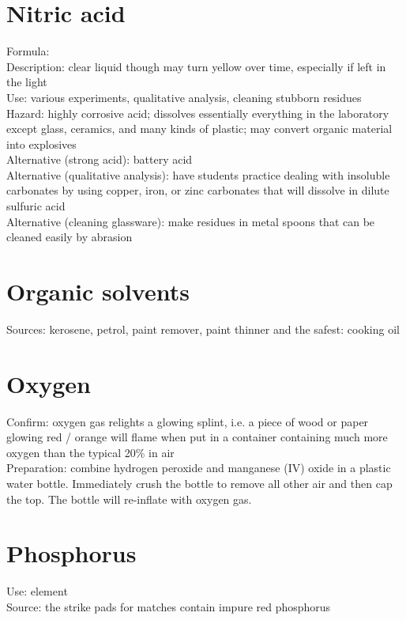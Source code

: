 \section{Nitric acid}
\label{sec:}
Formula: \\
Description: clear liquid though may turn yellow over time, 
especially if left in the light\\
Use: various experiments, 
qualitative analysis, 
cleaning stubborn residues\\
Hazard: highly corrosive acid; 
dissolves essentially everything in the laboratory except glass, 
ceramics, 
and many kinds of plastic; 
may convert organic material into explosives\\
Alternative (strong acid): battery acid\\
Alternative (qualitative analysis): 
have students practice dealing with insoluble carbonates by using copper, 
iron, 
or zinc carbonates that will dissolve in dilute sulfuric acid\\
Alternative (cleaning glassware): 
make residues in metal spoons that can be cleaned easily by abrasion

\section{Organic solvents}
\label{sec:}
Sources: kerosene, 
petrol, 
paint remover, 
paint thinner and the safest: cooking oil

\section{Oxygen}
\label{sec:}
Confirm: oxygen gas relights a glowing splint, 
i.e. 
a piece of wood or paper glowing red / orange 
will flame when put in a container 
containing much more oxygen than the typical 20\% in air\\
Preparation: combine hydrogen peroxide 
and manganese (IV) oxide in a plastic water bottle. 
Immediately crush the bottle to remove all other air and then cap the top. 
The bottle will re-inflate with oxygen gas.

\section{Phosphorus}
\label{sec:}
Use: element\\
Source: the strike pads for matches contain impure red phosphorus

